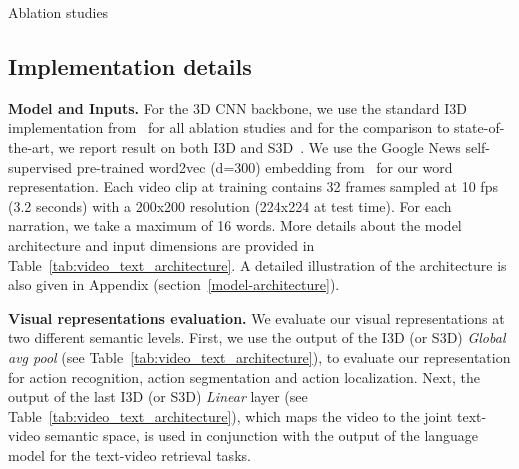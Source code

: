 \documentclass[10pt,twocolumn,letterpaper]{article}
\begin{document}
\begin{table*}
\begin{subtable}[t]{.33\linewidth}
{		}		
	\end{subtable}
	\vspace{-1mm}	
	\caption{Ablation studies}\label{tab:1}
	\vspace{-1mm}	
\end{table*}


\subsection{Implementation details}
\label{subsec:impl}


\noindent
\textbf{Model and Inputs.}
For the 3D CNN backbone, we use the standard I3D implementation from~\cite{carreira2017quovadis} for all ablation studies and for the comparison to state-of-the-art, we report result on both I3D and S3D~\cite{xie2018rethinking}.
We use the Google News self-supervised pre-trained word2vec (d=300) embedding from~\cite{mikolov13efficient} for our word representation.
Each video clip at training contains 32 frames sampled at 10 fps (3.2 seconds) with a 200x200 resolution (224x224 at test time). 
For each narration, we take a maximum of 16 words.
More details about the model architecture and input dimensions are provided in Table~\ref{tab:video_text_architecture}.
A detailed illustration of the architecture is also given in Appendix (section~\ref{model-architecture}).

\noindent
\textbf{Visual representations evaluation.}
We evaluate our visual representations at two different semantic levels.
First, we use the output of the I3D (or S3D) \emph{Global avg pool} (see Table~\ref{tab:video_text_architecture}), to evaluate our representation for action recognition, action segmentation and action localization.
Next, the output of the last I3D (or S3D) \emph{Linear} layer (see Table~\ref{tab:video_text_architecture}), which maps the video to the joint text-video semantic space, is used in conjunction with the output of the language model for the text-video retrieval tasks.
\end{document}
